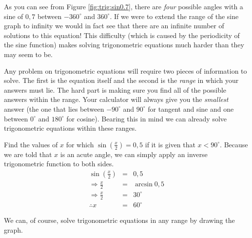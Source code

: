 As you can see from Figure \ref{fig:trig:sin0.7}, there are \emph{four} possible angles with a sine of $0,7$ between $-360^\circ$ and $360^\circ$. If we were to extend the range of the sine graph to infinity we would in fact see that there are an infinite number of solutions to this equation! This difficulty (which is caused by the periodicity of the sine function) makes solving trigonometric equations much harder than they may seem to be.

Any problem on trigonometric equations will require two pieces of information to solve. The first is the equation itself and the second is the \emph{range} in which your answers must lie. The hard part is making sure you find all of the possible answers within the range. Your calculator will always give you the \emph{smallest} answer (\ie the one that lies between $-90^\circ$ and $90^\circ$ for tangent and sine and one between $0^\circ$ and $180^\circ$ for cosine). Bearing this in mind we can already solve trigonometric equations within these ranges.

\begin{wex}{}{Find the values of $x$ for which $\sin\left( \tfrac{x}{2}\right)=0,5$ if it is given that $x <90^\circ$.} 
{Because we are told that $x$ is an acute angle, we
can simply apply an inverse trigonometric function to both sides.
\begin{eqnarray}
\sin\left( \tfrac{x}{2}\right) &=& 0,5 \\
\Rightarrow  \tfrac{x}{2} &=& \arcsin{0,5} \\
\Rightarrow \tfrac{x}{2} &=& 30^\circ \\
\therefore x &=&60^\circ 
\end{eqnarray}}
\end{wex}

We can, of course, solve trigonometric equations in any range by drawing the graph.

